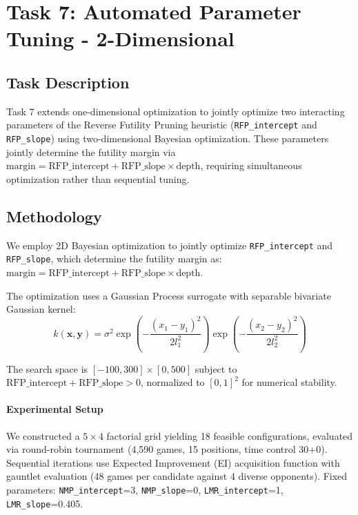 \section{Task 7: Automated Parameter Tuning - 2-Dimensional}

    \subsection{Task Description}
    Task 7 extends one-dimensional optimization to jointly optimize two interacting parameters of the Reverse Futility Pruning heuristic (\texttt{RFP\_intercept} and \texttt{RFP\_slope}) using two-dimensional Bayesian optimization. These parameters jointly determine the futility margin via $\text{margin} = \text{RFP\_intercept} + \text{RFP\_slope} \times \text{depth}$, requiring simultaneous optimization rather than sequential tuning.

  \subsection{Methodology}

  We employ 2D Bayesian optimization to jointly optimize \texttt{RFP\_intercept} and \texttt{RFP\_slope}, which determine the futility margin as:
  $\text{margin} = \text{RFP\_intercept} + \text{RFP\_slope} \times \text{depth}$.

  The optimization uses a Gaussian Process surrogate with separable bivariate Gaussian kernel:
  \begin{equation}
  k(\mathbf{x}, \mathbf{y}) = \sigma^2 \exp\left(-\frac{(x_1 - y_1)^2}{2l_1^2}\right) \exp\left(-\frac{(x_2 - y_2)^2}{2l_2^2}\right)
  \end{equation}

  The search space is $[-100, 300] \times [0, 500]$ subject to $\text{RFP\_intercept} + \text{RFP\_slope} > 0$, normalized to $[0,1]^2$ for numerical stability.

  \paragraph{Experimental Setup}
  We constructed a $5 \times 4$ factorial grid yielding 18 feasible configurations, evaluated via round-robin tournament (4,590 games, 15 positions, time control 30+0).
  Sequential iterations use Expected Improvement (EI) acquisition function with gauntlet evaluation (48 games per candidate against 4 diverse opponents). Fixed parameters:
  \texttt{NMP\_intercept}=3, \texttt{NMP\_slope}=0, \texttt{LMR\_intercept}=1, \texttt{LMR\_slope}=0.405.

